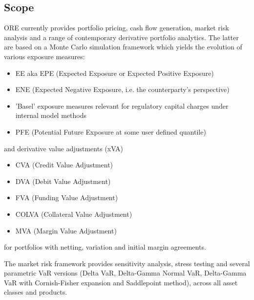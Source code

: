 \documentclass[12pt, a4paper]{article}
\begin{document}
\subsection{Scope}

ORE currently provides portfolio pricing, cash flow generation, market risk analysis and a range of contemporary derivative portfolio analytics. The latter are based on a Monte Carlo simulation framework which yields 
the evolution of various exposure measures:
\begin{itemize}
\item EE aka EPE (Expected Exposure or Expected Positive Exposure)
\item ENE (Expected Negative Exposure, i.e. the counterparty's perspective)
\item 'Basel' exposure measures relevant for regulatory capital charges under internal model methods 
\item PFE (Potential Future Exposure at some user defined quantile)
\end{itemize}
and derivative value adjustments (xVA)
\begin{itemize}
\item CVA (Credit Value Adjustment)
\item DVA (Debit Value Adjustment)
\item FVA (Funding Value Adjustment)
\item COLVA (Collateral Value Adjustment)
\item MVA (Margin Value Adjustment)
\end{itemize}
for portfolios with netting, variation and initial margin agreements. 

\medskip
The market risk framework provides sensitivity analysis, stress testing and several parametric VaR versions (Delta VaR, Delta-Gamma Normal VaR, Delta-Gamma VaR with Cornish-Fisher expansion and Saddlepoint method),  across all asset classes and products. 
\end{document}
